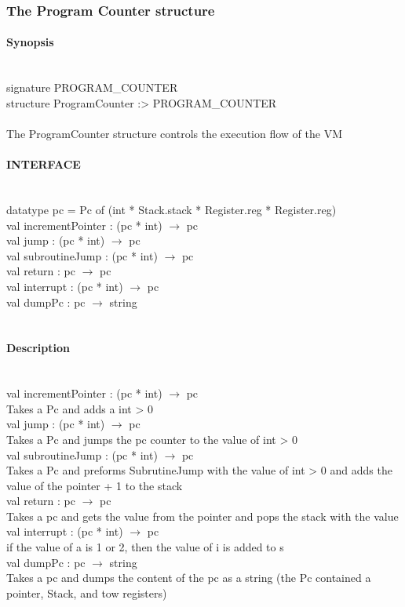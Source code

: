 \documentclass{article}
\begin{document}
\subsubsection{The Program Counter structure}
\paragraph{Synopsis} \ 
\\
signature PROGRAM_COUNTER\\
structure ProgramCounter :> PROGRAM_COUNTER\\
\\
The ProgramCounter structure controls the execution flow of the VM
\\
\paragraph{INTERFACE} \ 
\\
	datatype pc = Pc of (int * Stack.stack * Register.reg * Register.reg)
\\
	val incrementPointer : (pc * int) $\rightarrow$ pc\\
	val jump : (pc * int) $\rightarrow$ pc\\
	val subroutineJump : (pc * int) $\rightarrow$ pc\\ 						
	val return : pc $\rightarrow$ pc\\	
    val interrupt : (pc * int) $\rightarrow$ pc\\
    val dumpPc : pc $\rightarrow$ string\\
\\
\paragraph{Description} \ 
\\
	val incrementPointer : (pc * int) $\rightarrow$ pc\\
		Takes a Pc and adds a int > 0\\							
	val jump : (pc * int) $\rightarrow$ pc\\
		Takes a Pc and jumps the pc counter to the value of int > 0\\
	val subroutineJump : (pc * int) $\rightarrow$ pc\\
		Takes a Pc and preforms SubrutineJump with the value of  int > 0 and adds the  value of the pointer + 1 to the stack\\						
	val return : pc $\rightarrow$ pc\\
    	Takes a pc and gets the value from the pointer and pops the stack with the value\\
	val interrupt : (pc * int) $\rightarrow$ pc\\							
		if the value of a is 1 or 2, then the value of i is added to s\\
	val dumpPc : pc $\rightarrow$ string\\
		Takes a pc and dumps the content of the pc as a string (the Pc contained a pointer, Stack, and tow registers)\\
\end{document}
